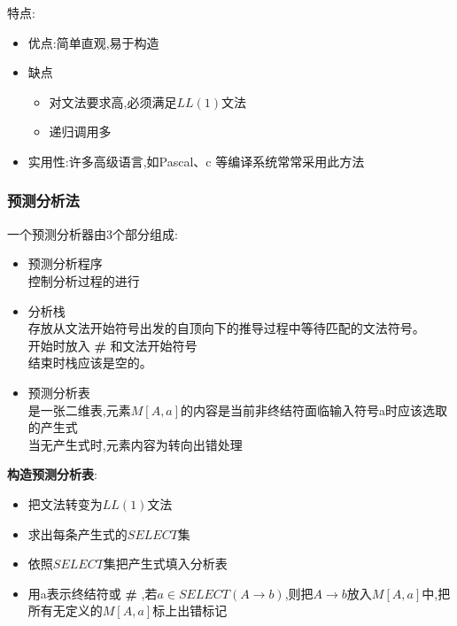 \documentclass[UTF8,a4paper]{ctexart}
\begin{document}
 特点:
 \begin{itemize}
  \item 优点:简单直观,易于构造
  \item 缺点
        \begin{itemize}
         \item 对文法要求高,必须满足$LL(1)$文法
         \item 递归调用多
        \end{itemize}
  \item 实用性:许多高级语言,如Pascal、c 等编译系统常常采用此方法
 \end{itemize}

 \subsubsection{预测分析法}
 一个预测分析器由3个部分组成:
 \begin{itemize}
  \item 预测分析程序\\
        控制分析过程的进行
  \item 分析栈\\
        存放从文法开始符号出发的自顶向下的推导过程中等待匹配的文法符号。\\
        开始时放入 \textbf{\#} 和文法开始符号\\
        结束时栈应该是空的。
  \item 预测分析表\\
        是一张二维表,元素$M[A,a]$的内容是当前非终结符面临输入符号a时应该选取的产生式\\
        当无产生式时,元素内容为转向出错处理
 \end{itemize}

 \textbf{构造预测分析表}:
 \begin{itemize}
  \item 把文法转变为$LL(1)$文法
  \item 求出每条产生式的$SELECT$集
  \item 依照$SELECT$集把产生式填入分析表
  \item 用a表示终结符或 \textbf{\#} ,若$a\in SELECT(A\to b)$,则把$A\to b$放入$M[A,a]$中,把所有无定义的$M[A,a]$标上出错标记
 \end{itemize}
\end{document}
